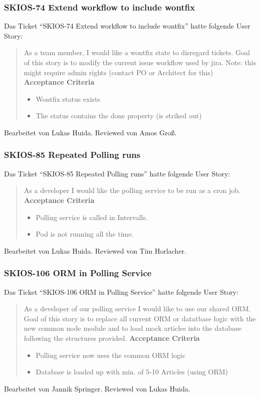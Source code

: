 \subsubsection{SKIOS-74 Extend workflow to include wontfix}
Das Ticket \enquote{SKIOS-74 Extend workflow to include wontfix} hatte folgende User Story:
\begin{quotation}
    As a team member, I would like a wontfix state to disregard tickets.
    Goal of this story is to modify the current issue workflow used by jira.
    Note: this might require admin rights (contact PO or Architect for this) \\
    \textbf{Acceptance Criteria}
    \begin{itemize}
        \item Wontfix status exists
        \item The status contains the done property (is striked out)
    \end{itemize}
\end{quotation}
Bearbeitet von Lukas Huida.
Reviewed von Amos Groß.

\subsubsection{SKIOS-85 Repeated Polling runs}
Das Ticket \enquote{SKIOS-85 Repeated Polling runs} hatte folgende User Story:
\begin{quotation}
    As a developer I would like the polling service to be run as a cron job. \\
    \textbf{Acceptance Criteria}
    \begin{itemize}
        \item Polling service is called in Intervalls.
        \item Pod is not running all the time.
    \end{itemize}
\end{quotation}
Bearbeitet von Lukas Huida.
Reviewed von Tim Horlacher.

\subsubsection{SKIOS-106 ORM in Polling Service}
Das Ticket \enquote{SKIOS-106 ORM in Polling Service} hatte folgende User Story:
\begin{quotation}
    As a developer of our polling service I would like to use our shared ORM.
    Goal of this story is to replace all current ORM or datatbase logic with the new common node module and to load mock articles into the database following the structures provided.
\textbf{Acceptance Criteria}
\begin{itemize}
    \item Polling service now uses the common ORM logic
    \item Database is loaded up with min. of 5-10 Articles (using ORM)
\end{itemize}
\end{quotation}
Bearbeitet von Jannik Springer.
Reviewed von Lukas Huida.

